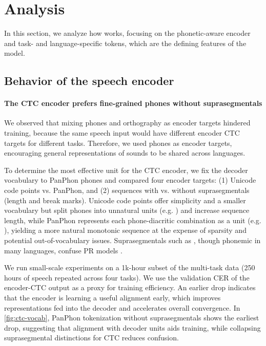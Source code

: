 \newcommand{\cmark}{\ding{51}}%
\newcommand{\xmark}{\ding{55}}%
\section{Analysis}

In this section, we analyze how \POWSM works, focusing on the phonetic-aware encoder and task- and language-specific tokens, which are the defining features of the model.

\subsection{Behavior of the speech encoder}

\paragraph{The CTC encoder prefers fine-grained phones without suprasegmentals}
\label{sec:analysis-ctc-target}
We observed that mixing phones and orthography as encoder targets hindered training, because the same speech input would have different encoder CTC targets for different tasks. 
Therefore, we used phones as encoder targets, encouraging general representations of sounds to be shared across languages.

To determine the most effective unit for the CTC encoder, we fix the decoder vocabulary to PanPhon phones and compared four encoder targets: (1) Unicode code points vs. PanPhon, and (2) sequences with vs. without suprasegmentals (length and break marks). Unicode code points offer simplicity and a smaller vocabulary but split phones into unnatural units (e.g. ) and increase sequence length, while PanPhon represents each phone-diacritic combination as a unit (e.g. ), yielding a more natural monotonic sequence at the expense of sparsity and potential out-of-vocabulary issues. Suprasegmentals such as \textipa{/\textlengthmark/}, though phonemic in many languages, confuse PR models \citep{zhu-etal-2025-zipa}. 


We run small-scale experiments on a 1k-hour subset of the multi-task data (250 hours of speech repeated across four tasks).
We use the validation CER of the encoder-CTC output as a proxy for training efficiency. 
An earlier drop indicates that the encoder is learning a useful alignment early, which improves representations fed into the decoder and accelerates overall convergence. 
In \autoref{fig:ctc-vocab}, PanPhon tokenization without suprasegmentals shows the earliest drop, suggesting that alignment with decoder units aids training, while
collapsing suprasegmental distinctions for CTC reduces confusion.

